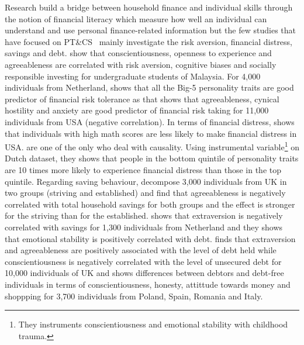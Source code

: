 \documentclass[a4paper, 11pt, onecolumn]{article}
\newcommand{\PTCS}{PT\&CS}
\begin{document}
Research build a bridge between household finance and individual skills through the notion of financial literacy which measure how well an individual can understand and use personal finance-related information \citep{Huston2010, Hastings2013, Gaurav2012, Klapper2012, Horn2021} but the few studies that have focused on \PTCS~ mainly investigate the risk aversion, financial distress, savings and debt.
\cite{Nga2013} show that conscientiousness, openness to experience and agreeableness are correlated with risk aversion, cognitive biases and socially responsible investing for undergraduate students of Malaysia.
For 4,000 individuals from Netherland, \cite{Pinjisakikool2017} shows that all the Big-5 personality traits are good predictor of financial risk tolerance as \cite{Bucciol2017} that shows that agreeableness, cynical hostility and anxiety are good predictor of financial risk taking for 11,000 individuals from USA (negative correlation).
In terms of financial distress, \cite{Agarwal2013} shows that individuals with high math scores are less likely to make financial distress in USA.
\cite{Parise2019} are one of the only who deal with causality.
Using instrumental variable\footnote{They instruments conscientiousness and emotional stability with childhood trauma.} on Dutch dataset, they shows that people in the bottom quintile of personality traits are 10 times more likely to experience financial distress than those in the top quintile.
Regarding saving behaviour, \cite{Gerhard2018} decompose 3,000 individuals from UK in two groups (striving and established) and find that agreeableness is negatively correlated with total household savings for both groups and the effect is stronger for the striving than for the established.
\cite{Nyhus2001} shows that extraversion is negatively correlated with savings for 1,300 individuals from Netherland and they shows that emotional stability is positively correlated with debt.
\cite{Brown2014} finds that extraversion and agreeableness are positively associated with the level of debt held while conscientiousness is negatively correlated with the level of unsecured debt for 10,000 individuals of UK and \cite{Forlicz2019} shows differences between debtors and debt-free individuals in terms of conscientiousness, honesty, attittude towards money and shoppping for 3,700 individuals from Poland, Spain, Romania and Italy.
\end{document}
